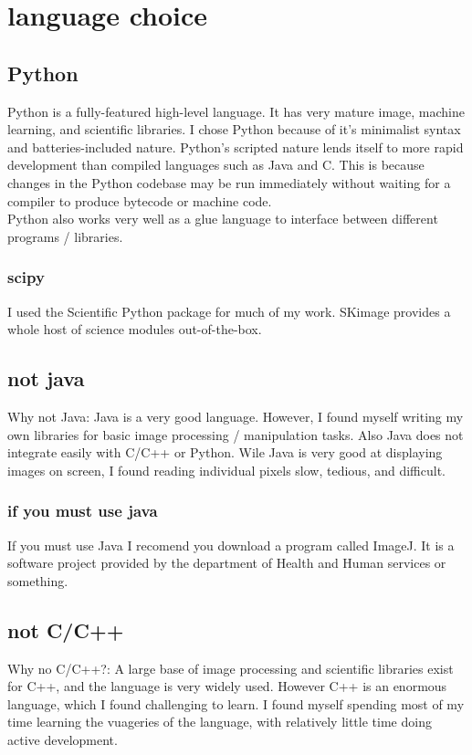 \chapter{language choice}
\section{Python}
Python is a fully-featured high-level language. It has very mature image, machine learning, and scientific libraries.  I chose Python because of it's minimalist syntax and batteries-included nature.  Python's scripted nature lends itself to more rapid development than compiled languages such as Java and C. This is because changes in the Python codebase may be run immediately without waiting for a compiler to produce bytecode or machine code.\\
Python also works very well as a glue language to interface between different programs / libraries.
\subsection{scipy}
I used the Scientific Python package for much of my work.  SKimage provides a whole host of science modules out-of-the-box.
\section{not java}
Why not Java:  Java is a very good language. However, I found myself writing my own libraries for basic image processing / manipulation tasks.  Also Java does not integrate easily with C/C++ or Python.  Wile Java is very good at displaying images on screen, I found reading individual pixels slow, tedious, and difficult.
\subsection{if you must use java}
If you must use Java I recomend you download a program called ImageJ.  It is a software project provided by the department of Health and Human services or something.
\section{not C/C++}
Why no C/C++?:    A large base of image processing and scientific libraries exist for C++, and the language is very widely used.  However C++ is an enormous language, which I found challenging to learn. I found myself spending most of my time learning the vuageries of the language, with relatively little time doing active development.


\newpage
